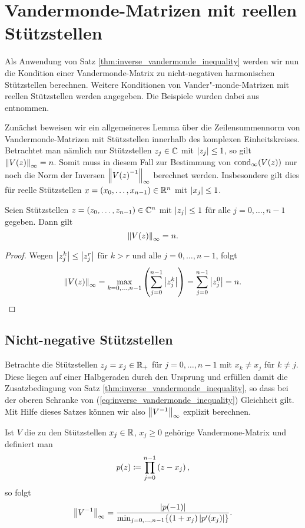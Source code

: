 
\chapter{Vandermonde-Matrizen mit reellen Stützstellen}
Als Anwendung von Satz \ref{thm:inverse_vandermonde_inequality} werden wir nun
die Kondition einer Vandermonde-Matrix zu nicht-negativen harmonischen Stützstellen
berechnen.
Weitere Konditionen von Vander"-monde-Matrizen mit reellen Stützstellen werden
angegeben.
Die Beispiele wurden dabei aus \cite[S. 197-199]{gautschi1} entnommen.

Zunächst beweisen wir ein allgemeineres Lemma über die Zeilensummennorm
von Vandermonde-Matrizen mit Stützstellen innerhalb des komplexen
Einheitskreises.
Betrachtet man nämlich nur Stützstellen $z_j \in \C$ mit $\abs{z_j} \leq 1$,
so gilt $\norm{\Vand{z}}_{\infty} = n$.
Somit muss in diesem Fall zur Bestimmung von $\cond[\infty]{\Vand{z}}$ nur noch die
Norm der Inversen $\norm{\Vand{z}^{-1}}_{\infty}$ berechnet werden.
Insbesondere gilt dies für reelle Stützstellen
$x = (x_0, \dots, x_{n-1}) \in \Rn$ mit $\abs{x_j} \leq 1$.

\begin{lemma}
    \label{lemma:infty_norm_vandermonde_unit_roots}
    Seien Stützstellen $z = (z_0, \dots, z_{n-1}) \in \Cn$
    mit $\abs{z_j} \leq 1$ für alle\linebreak
    $j=0,\dots,n-1$ gegeben.
    Dann gilt
    \[
        \norm{V(z)}_{\infty} = n.
    \]
\end{lemma}

\begin{proof}
    Wegen $\abs{z_j^k} \leq \abs{z_j^r}$ für $k > r$ und alle $j = 0, \dots, n-1$, folgt
    \[
        \norm{V(z)}_{\infty}
        = \max_{k=0,\dots,n-1} \left( \sum_{j=0}^{n-1} \abs{z_j^k} \right)
        = \sum_{j=0}^{n-1} \abs{z_j^0}
        = n.
    \]
\end{proof}

\section{Nicht-negative Stützstellen}
Betrachte die Stützstellen $z_j = x_j \in \R_+$ für $j = 0, \dots, n-1$
mit $x_k \neq x_j$ für $k \neq j$.
Diese liegen auf einer Halbgeraden durch den Ursprung und erfüllen damit die
Zusatzbedingung von Satz \ref{thm:inverse_vandermonde_inequality},
so dass bei der oberen Schranke von (\ref{eq:inverse_vandermonde_inequality})
Gleichheit gilt.
Mit Hilfe dieses Satzes können wir also $\norm{V^{-1}}_\infty$ explizit berechnen.
\begin{lemma}
    \label{lemma:nonnegative_real_nodes}
    Ist $V$ die zu den Stützstellen $x_j \in \R$, $x_j \geq 0$ gehörige
    Vandermone-Matrix und definiert man
    \[
        p(z) \defeq \prod_{j=0}^{n-1} \left( z - x_j \right),
    \]
    so folgt
    \[
        \norm{V^{-1}}_{\infty} = \frac{ \abs{p(-1)}}{\min_{j=0, \dots, n-1} \{ (1+x_j) \abs{p^{\prime}(x_j)} \}}.
    \]
\end{lemma}

